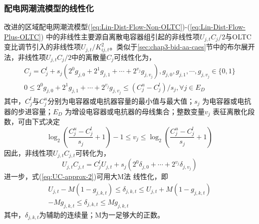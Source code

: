 \subsubsection{配电网潮流模型的线性化}
改进的区域配电网潮流模型(\ref{eq:Lin-Dist-Flow-Non-OLTC})-(\ref{eq:Lin-Dist-Flow-Plus-OLTC}) 中的非线性主要源自离散电容器组引起的非线性项${U_{j,t}}{C_j}/2$与OLTC变比调节引入的非线性项${{{U_{j,t}}}}/{{K_{ij,t}^2}}$。类似于\ref{sec:chap3-bid-aa-caes}节中的布尔展开法，非线性项${U_{j,t}}{C_j}/2$中的离散量$C_j$可线性化为\cite{PDN-Model-Reactive-Power-DT-16, CAES-IES-16-Rui}，
\begin{subequations}
\begin{gather}
\label{eq:UC-approx}
{{C_j} = C_j^l + {s_j}({{2^0}{g_{j,0}} + {2^1}{g_{j,1}} + \cdots + {2^{{v_j}}}{g_{j,{v_j}}}})}, {{g_{j,0}},{g_{j,1}}, \cdots ,{g_{j,{v_j}}} \in \{ 0,1\} }\\
{0 \le {2^0}{g_{j,0}} + {2^1}{g_{j,1}} +  \cdots  + {2^{{v_j}}}{g_{j,{v_j}}} \le ({C_j^u - C_j^l})/{s_j},}{\forall j \in {E_D}}
\end{gather}
\end{subequations}
其中，$C_j^l$与$C_j^u$分别为电容器或电抗器容量的最小值与最大值；${s_j}$ 为电容器或电抗器的步进容量；${E_D}$ 为增设电容器或电抗器的母线集合；整数变量$v_j$ 表征离散化段数，可由下式决定
\begin{equation}
{\log _2}({\frac{{C_j^u - C_j^l}}{{{s_j}}} + 1})-1 \le {v_j} \le {\log _2}({\frac{{C_j^u - C_j^l}}{{{s_j}}} + 1})
\end{equation}
因此，非线性项${U_{j,t}}{C_{j,t}}$可转化为，
\begin{equation}
\label{eq:UC-approx-2}
{U_{j,t}}{C_{j,t}} = C_j^l{U_{j,t}} + {s_j}({{2^0}{\delta _{j,0}} +  \cdots  + {2^{{v_j}}}{\delta _{j,{v_j}}}})
\end{equation}
进一步，式(\ref{eq:UC-approx-2})可用大M法\cite{Big-M-1981} 线性化，即
\begin{subequations}
\label{eq:UC-approx-final}
\begin{gather}
{{U_{j,t}} - M({1 - {g_{j,k,t}}}) \le {\delta _{j,k,t}} \le {U_{j,t}} + M({1 - {g_{j,k,t}}})}\\
{ - M{g_{j,k,t}} \le {\delta _{j,k,t}} \le M{g_{j,k,t}}}
\end{gather}
\end{subequations}
其中，${\delta _{j,k,t}}$为辅助的连续量；M为一足够大的正数。

